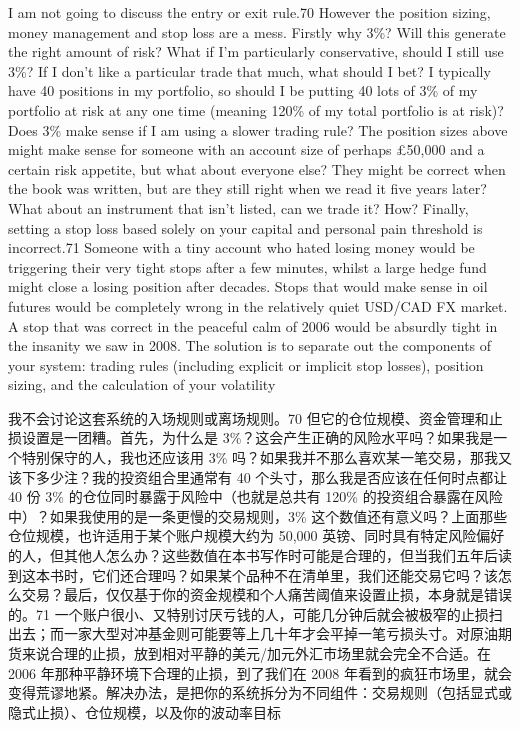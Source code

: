 \bipairgap

\begin{englishblock} I am not going to discuss the entry or exit rule.70 However the position sizing, money management and stop loss are a mess. Firstly why 3\%? Will this generate the right amount of risk? What if I'm particularly conservative, should I still use 3\%? If I don't like a particular trade that much, what should I bet? I typically have 40 positions in my portfolio, so should I be putting 40 lots of 3\% of my portfolio at risk at any one time (meaning 120\% of my total portfolio is at risk)? Does 3\% make sense if I am using a slower trading rule? The position sizes above might make sense for someone with an account size of perhaps £50,000 and a certain risk appetite, but what about everyone else? They might be correct when the book was written, but are they still right when we read it five years later? What about an instrument that isn't listed, can we trade it? How? Finally, setting a stop loss based solely on your capital and personal pain threshold is incorrect.71 Someone with a tiny account who hated losing money would be triggering their very tight stops after a few minutes, whilst a large hedge fund might close a losing position after decades. Stops that would make sense in oil futures would be completely wrong in the relatively quiet USD/CAD FX market. A stop that was correct in the peaceful calm of 2006 would be absurdly tight in the insanity we saw in 2008. The solution is to separate out the components of your system: trading rules (including explicit or implicit stop losses), position sizing, and the calculation of your volatility \end{englishblock}

\begin{chineseblock}我不会讨论这套系统的入场规则或离场规则。70 但它的仓位规模、资金管理和止损设置是一团糟。首先，为什么是 3\%？这会产生正确的风险水平吗？如果我是一个特别保守的人，我也还应该用 3\% 吗？如果我并不那么喜欢某一笔交易，那我又该下多少注？我的投资组合里通常有 40 个头寸，那么我是否应该在任何时点都让 40 份 3\% 的仓位同时暴露于风险中（也就是总共有 120\% 的投资组合暴露在风险中）？如果我使用的是一条更慢的交易规则，3\% 这个数值还有意义吗？上面那些仓位规模，也许适用于某个账户规模大约为 50,000 英镑、同时具有特定风险偏好的人，但其他人怎么办？这些数值在本书写作时可能是合理的，但当我们五年后读到这本书时，它们还合理吗？如果某个品种不在清单里，我们还能交易它吗？该怎么交易？最后，仅仅基于你的资金规模和个人痛苦阈值来设置止损，本身就是错误的。71 一个账户很小、又特别讨厌亏钱的人，可能几分钟后就会被极窄的止损扫出去；而一家大型对冲基金则可能要等上几十年才会平掉一笔亏损头寸。对原油期货来说合理的止损，放到相对平静的美元/加元外汇市场里就会完全不合适。在 2006 年那种平静环境下合理的止损，到了我们在 2008 年看到的疯狂市场里，就会变得荒谬地紧。解决办法，是把你的系统拆分为不同组件：交易规则（包括显式或隐式止损）、仓位规模，以及你的波动率目标\end{chineseblock}

